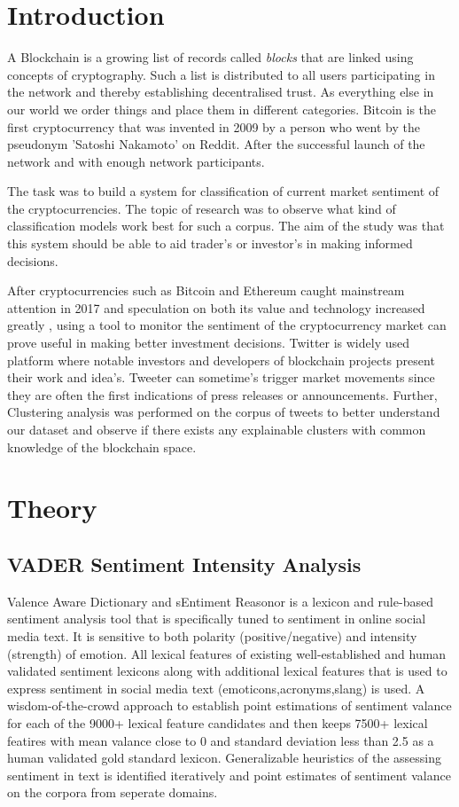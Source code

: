\documentclass[a4paper, 12pt]{article}
\begin{document}
\section{Introduction}
A Blockchain is a growing list of records called \textit{blocks} that are linked using concepts of cryptography. Such a list is distributed to all users participating in the network and thereby establishing decentralised trust. \cite{nakamotobitcoin}
As everything else in our world we order things and place them in different categories. Bitcoin is the first cryptocurrency that was invented in 2009 by a person who went by the pseudonym 'Satoshi Nakamoto' on Reddit. After the successful launch of the network and with enough network participants.

The task was to build a system for classification of current market sentiment of the cryptocurrencies. The topic of research was to observe what kind of classification models work best for such a corpus. The aim of the study was that this system should be able to aid trader's or investor's in making informed decisions.

After cryptocurrencies such as Bitcoin and Ethereum caught mainstream attention in 2017 and speculation on both its value and technology increased greatly , using a tool to monitor the sentiment of the cryptocurrency market can prove useful in making better investment decisions. Twitter is widely used platform where notable investors and developers of blockchain projects present their work and idea's. Tweeter can sometime's trigger market movements since they are often the first indications of press releases or announcements. Further, Clustering analysis was performed on the corpus of tweets to better understand our dataset and observe if there exists any explainable clusters with common knowledge of the blockchain space.

\pagebreak
\section{Theory}

\subsection{VADER Sentiment Intensity Analysis}
Valence Aware Dictionary and sEntiment Reasonor is a lexicon and rule-based sentiment analysis tool that is specifically tuned to sentiment in online social media text. It is sensitive to both polarity (positive/negative) and intensity (strength) of emotion. All lexical features of existing well-established and human validated sentiment lexicons along with additional lexical features that is used to express sentiment in social media text (emoticons,acronyms,slang) is used. A wisdom-of-the-crowd approach to establish point estimations of sentiment valance for each of the 9000+ lexical feature candidates and then keeps 7500+ lexical featires with mean valance close to 0 and standard deviation less than 2.5 as a human validated gold standard lexicon. Generalizable heuristics of the assessing sentiment in text is identified iteratively and point estimates of sentiment valance on the corpora from seperate domains.  \cite{gilbert2014vader}
\end{document}
